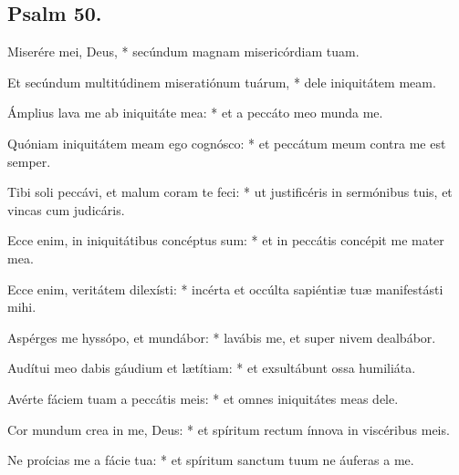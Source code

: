 









\subsection{Psalm 50.}

Miserére mei, Deus, * secúndum magnam misericórdiam tuam.

Et secúndum multitúdinem miseratiónum tuárum, * dele iniquitátem meam.

Ámplius lava me ab iniquitáte mea: * et a peccáto meo munda me.

Quóniam iniquitátem meam ego cognósco: * et peccátum meum contra me est semper.

Tibi soli peccávi, et malum coram te feci: * ut justificéris in sermónibus tuis, et vincas cum judicáris.

Ecce enim, in iniquitátibus concéptus sum: * et in peccátis concépit me mater mea.

Ecce enim, veritátem dilexísti: * incérta et occúlta sapiéntiæ tuæ manifestásti mihi.

Aspérges me hyssópo, et mundábor: * lavábis me, et super nivem dealbábor.

Audítui meo dabis gáudium et lætítiam: * et exsultábunt ossa humiliáta.

Avérte fáciem tuam a peccátis meis: * et omnes iniquitátes meas dele.

Cor mundum crea in me, Deus: * et spíritum rectum ínnova in viscéribus meis.

Ne proícias me a fácie tua: * et spíritum sanctum tuum ne áuferas a me.

